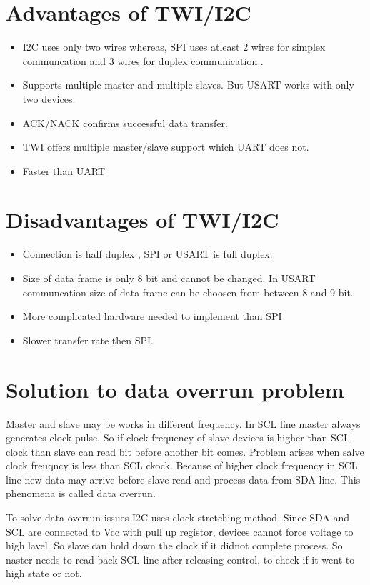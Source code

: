 \documentclass{article}
\begin{document}
\section{Advantages of TWI/I2C}

\begin{itemize}
	\item I2C uses only two wires whereas,
	 SPI uses atleast 2 wires for simplex communcation and 3 wires for duplex communication . 
	 \item Supports multiple master and multiple slaves. But USART works with only two devices.
	 \item ACK/NACK confirms successful data transfer.
	 \item TWI offers multiple master/slave support which UART does not.
	 \item Faster than UART
\end{itemize}

\section{Disadvantages of TWI/I2C}

\begin{itemize}
	\item Connection is half duplex , SPI or USART is full duplex.
	\item Size of data frame is only 8 bit and cannot be changed.
	 In USART communcation size of data frame can be choosen from between 8 and 9 bit.
	\item More complicated hardware needed to implement than SPI
	\item Slower transfer rate then SPI.
\end{itemize}

\section{Solution to data overrun problem}
Master and slave may be works in different frequency.
In SCL line master always generates clock pulse.
So if clock frequency of slave devices is higher than SCL clock than slave can read bit before another bit comes.
Problem arises when salve clock freuqncy is less than SCL ckock.
Because of higher clock frequency in SCL line new data may arrive before slave read and process data from SDA line.
This phenomena is called data overrun.


To solve data overrun issues I2C uses clock stretching method. 
Since SDA and SCL are connected to Vcc with pull up registor, devices cannot force voltage to high lavel. 
So slave can hold down the clock if it didnot complete process.
So naster needs to read back SCL line  after releasing control, to check if it went to high state or not. 
\end{document}
